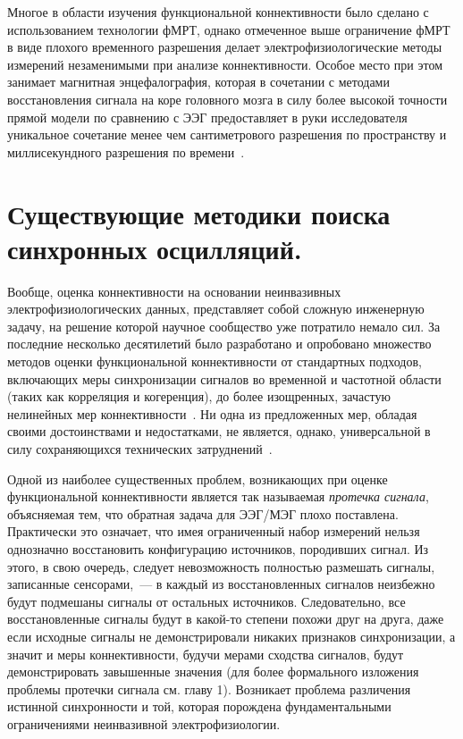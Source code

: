 Многое в области изучения функциональной коннективности было сделано с
использованием технологии фМРТ, однако отмеченное выше ограничение фМРТ в виде
плохого временного разрешения делает электрофизиологические методы измерений
незаменимыми при анализе коннективности. Особое место при этом занимает
магнитная энцефалография, которая в сочетании с методами восстановления сигнала
на коре головного мозга в силу более высокой точности прямой модели по
сравнению с ЭЭГ предоставляет в руки исследователя уникальное сочетание менее
чем сантиметрового разрешения по пространству и миллисекундного разрешения по
времени~\cite{hamalainen, Baillet, Gross2013}.


\section{Существующие методики поиска синхронных осцилляций.}

Вообще, оценка коннективности на основании неинвазивных электрофизиологических
данных, представляет собой сложную инженерную задачу, на решение которой
научное сообщество уже потратило немало сил.  За последние несколько
десятилетий было разработано и опробовано множество методов оценки
функциональной коннективности от стандартных подходов, включающих меры
синхронизации сигналов во временной и частотной области (таких как корреляция и
когеренция), до более изощренных, зачастую нелинейных мер
коннективности~\cite{Marzetti2008, Schoffelen2009, Colclough2015, kaminski,
greenblatt_conn, hillebrand, imcoh, Lachaux1999, env_corr, Brookes2012,
Brookes2011, Hillebrand2012, Hipp2012, PLI, wPLI, Chella2015, Chella2016,
Wibral2011, Ioannides2000}.  Ни одна из предложенных мер, обладая своими
достоинствами и недостатками, не является, однако, универсальной в силу
сохраняющихся технических затруднений~\cite{Colclough2016, Bastos2016}.

Одной из наиболее существенных проблем, возникающих при оценке функциональной
коннективности является так называемая \emph{протечка сигнала}, объясняемая
тем, что обратная задача для ЭЭГ/МЭГ плохо поставлена. Практически это
означает, что имея ограниченный набор измерений нельзя однозначно восстановить
конфигурацию источников, породивших сигнал. Из этого, в свою очередь, следует
невозможность полностью размешать сигналы, записанные сенсорами,~--- в каждый
из восстановленных сигналов неизбежно будут подмешаны сигналы от остальных
источников. Следовательно, все восстановленные сигналы будут в какой-то степени
похожи друг на друга, даже если исходные сигналы не демонстрировали никаких
признаков синхронизации, а значит и меры коннективности, будучи мерами сходства
сигналов, будут демонстрировать завышенные значения (для более формального
изложения проблемы протечки сигнала см. главу 1). Возникает проблема различения
истинной синхронности и той, которая порождена фундаментальными ограничениями
неинвазивной электрофизиологии.

